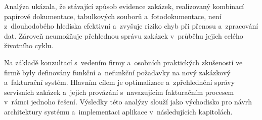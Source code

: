 Analýza ukázala, že stávající způsob evidence zakázek, realizovaný kombinací papírové dokumentace, tabulkových souborů a~fotodokumentace, není z~dlouhodobého hlediska efektivní a~zvyšuje riziko chyb při přenosu a~zpracování dat. Zároveň neumožňuje přehlednou správu zakázek v~průběhu jejich celého životního cyklu.

Na základě konzultací s~vedením firmy a~osobních praktických zkušeností ve firmě byly definovány funkční a~nefunkční požadavky na nový zakázkový a~fakturační systém. Hlavním cílem je optimalizace a~zpřehlednění správy servisních zakázek a~jejich provázání s~navazujícím fakturačním procesem v~rámci jednoho řešení. Výsledky této analýzy slouží jako východisko pro návrh architektury systému a~implementaci aplikace v~následujících kapitolách.
